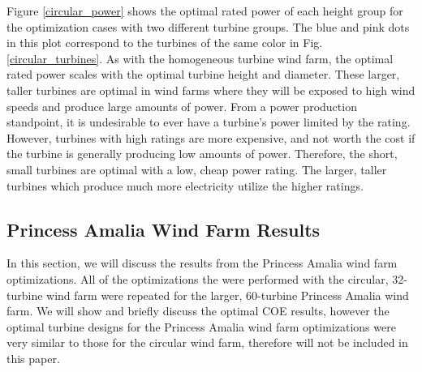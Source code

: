 Figure \ref{circular_power} shows the optimal rated power of each height group for the optimization cases with two different turbine groups. The blue and pink dots in this plot correspond to the turbines of the same color in Fig. \ref{circular_turbines}. As with the homogeneous turbine wind farm, the optimal rated power scales with the optimal turbine height and diameter. These larger, taller turbines are optimal in wind farms where they will be exposed to high wind speeds and produce large amounts of power. From a power production standpoint, it is undesirable to ever have a turbine's power limited by the rating. However, turbines with high ratings are more expensive, and not worth the cost if the turbine is generally producing low amounts of power. Therefore, the short, small turbines are optimal with a low, cheap power rating. The larger, taller turbines which produce much more electricity utilize the higher ratings.





\subsection{Princess Amalia Wind Farm Results}

In this section, we will discuss the results from the Princess Amalia wind farm optimizations.
All of the optimizations the were performed with the circular, 32-turbine wind farm were repeated for the larger, 60-turbine Princess Amalia wind farm. We will show and briefly discuss the optimal COE results, however the optimal turbine designs for the Princess Amalia wind farm optimizations were very similar to those for the circular wind farm, therefore will not be included in this paper.

